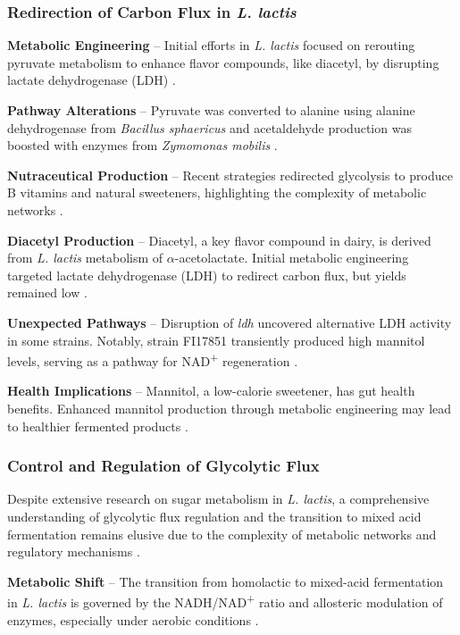 \subsubsection{Redirection of Carbon Flux in \textit{L. lactis}}
\textbf{Metabolic Engineering} – Initial efforts in \textit{L. lactis} focused on rerouting pyruvate metabolism to enhance flavor compounds, like diacetyl, by disrupting lactate dehydrogenase (LDH) \cite*{L3-SugarMet}.

\textbf{Pathway Alterations} – Pyruvate was converted to alanine using alanine dehydrogenase from \textit{Bacillus sphaericus} and acetaldehyde production was boosted with enzymes from \textit{Zymomonas mobilis} \cite*{L3-SugarMet}.

\textbf{Nutraceutical Production} – Recent strategies redirected glycolysis to produce B vitamins and natural sweeteners, highlighting the complexity of metabolic networks \cite*{L3-SugarMet}.


\textbf{Diacetyl Production} – Diacetyl, a key flavor compound in dairy, is derived from \textit{L. lactis} metabolism of $\alpha$-acetolactate. Initial metabolic engineering targeted lactate dehydrogenase (LDH) to redirect carbon flux, but yields remained low \cite*{L3-SugarMet}.

\textbf{Unexpected Pathways} – Disruption of \textit{ldh} uncovered alternative LDH activity in some strains. Notably, strain FI17851 transiently produced high mannitol levels, serving as a pathway for NAD\textsuperscript{+} regeneration \cite*{L3-SugarMet}.

\textbf{Health Implications} – Mannitol, a low-calorie sweetener, has gut health benefits. Enhanced mannitol production through metabolic engineering may lead to healthier fermented products \cite*{L3-SugarMet}.

\subsubsection{Control and Regulation of Glycolytic Flux}
Despite extensive research on sugar metabolism in \textit{L. lactis}, a comprehensive understanding of glycolytic flux regulation and the transition to mixed acid fermentation remains elusive due to the complexity of metabolic networks and regulatory mechanisms \cite*{L3-SugarMet}.

\textbf{Metabolic Shift} – The transition from homolactic to mixed-acid fermentation in \textit{L. lactis} is governed by the NADH/NAD\textsuperscript{+} ratio and allosteric modulation of enzymes, especially under aerobic conditions \cite*{L3-SugarMet}.


